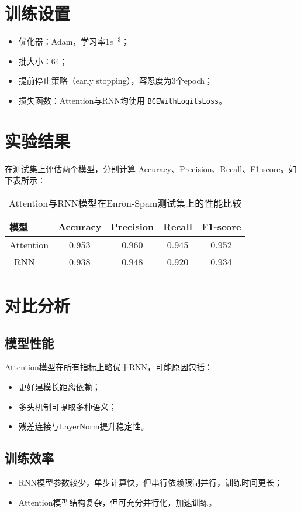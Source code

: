 \documentclass[11pt]{article}
\begin{document}
\section{训练设置}
\begin{itemize}
    \item 优化器：Adam，学习率$1e^{-3}$；
    \item 批大小：64；
    \item 提前停止策略（early stopping），容忍度为3个epoch；
    \item 损失函数：Attention与RNN均使用 \texttt{BCEWithLogitsLoss}。
\end{itemize}

\section{实验结果}
在测试集上评估两个模型，分别计算 Accuracy、Precision、Recall、F1-score。如下表所示：

\begin{table}[h]
\centering
\begin{tabular}{lcccc}
\toprule
模型 & Accuracy & Precision & Recall & F1-score \\\midrule
Attention & 0.953 & 0.960 & 0.945 & 0.952 \\\
RNN       & 0.938 & 0.948 & 0.920 & 0.934 \\\bottomrule
\end{tabular}
\caption{Attention与RNN模型在Enron-Spam测试集上的性能比较}
\end{table}

\section{对比分析}
\subsection{模型性能}
Attention模型在所有指标上略优于RNN，可能原因包括：
\begin{itemize}
    \item 更好建模长距离依赖；
    \item 多头机制可提取多种语义；
    \item 残差连接与LayerNorm提升稳定性。
\end{itemize}

\subsection{训练效率}
\begin{itemize}
    \item RNN模型参数较少，单步计算快，但串行依赖限制并行，训练时间更长；
    \item Attention模型结构复杂，但可充分并行化，加速训练。
\end{itemize}
\end{document}
